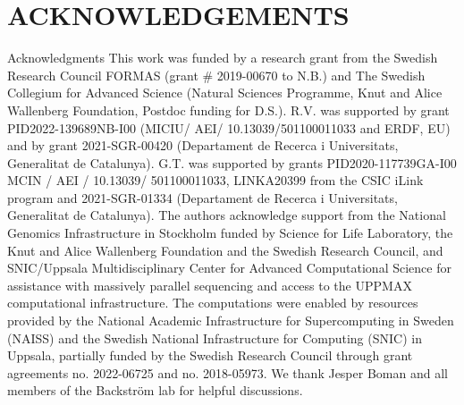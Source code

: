 \documentclass[lineno]{wiley-article}
\begin{document}


%


\section*{ACKNOWLEDGEMENTS}
Acknowledgments
This work was funded by a research grant from the Swedish Research Council FORMAS (grant \# 2019-00670 to N.B.) and The Swedish Collegium for Advanced Science (Natural Sciences Programme, Knut and Alice Wallenberg Foundation, Postdoc funding for D.S.). R.V. was supported by grant PID2022-139689NB-I00 (MICIU/ AEI/ 10.13039/501100011033 and ERDF, EU) and by grant 2021-SGR-00420 (Departament de Recerca i Universitats, Generalitat de Catalunya). G.T. was supported by grants PID2020-117739GA-I00 MCIN / AEI / 10.13039/ 501100011033, LINKA20399 from the CSIC iLink program and 2021-SGR-01334 (Departament de Recerca i Universitats, Generalitat de Catalunya). The authors acknowledge support from the National Genomics Infrastructure in Stockholm funded by Science for Life Laboratory, the Knut and Alice Wallenberg Foundation and the Swedish Research Council, and SNIC/Uppsala Multidisciplinary Center for Advanced Computational Science for assistance with massively parallel sequencing and access to the UPPMAX computational infrastructure. The computations were enabled by resources provided by the National Academic Infrastructure for Supercomputing in Sweden (NAISS) and the Swedish National Infrastructure for Computing (SNIC) in Uppsala, partially funded by the Swedish Research Council through grant agreements no. 2022-06725 and no. 2018-05973. We thank Jesper Boman and all members of the Backström lab for helpful discussions. 
\end{document}
